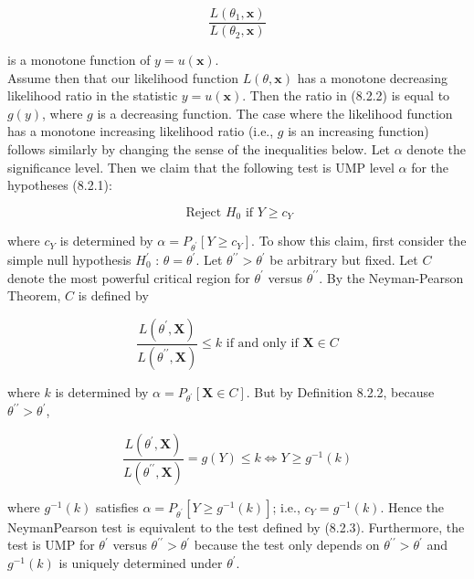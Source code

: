 \begin{equation*}
\frac{L\left(\theta_{1}, \mathbf{x}\right)}{L\left(\theta_{2}, \mathbf{x}\right)} \tag{8.2.2}
\end{equation*}


is a monotone function of $y=u(\mathbf{x})$.\\
Assume then that our likelihood function $L(\theta, \mathbf{x})$ has a monotone decreasing likelihood ratio in the statistic $y=u(\mathbf{x})$. Then the ratio in (8.2.2) is equal to $g(y)$, where $g$ is a decreasing function. The case where the likelihood function has a monotone increasing likelihood ratio (i.e., $g$ is an increasing function) follows similarly by changing the sense of the inequalities below. Let $\alpha$ denote the significance level. Then we claim that the following test is UMP level $\alpha$ for the hypotheses (8.2.1):


\begin{equation*}
\text { Reject } H_{0} \text { if } Y \geq c_{Y} \tag{8.2.3}
\end{equation*}


where $c_{Y}$ is determined by $\alpha=P_{\theta^{\prime}}\left[Y \geq c_{Y}\right]$. To show this claim, first consider the simple null hypothesis $H_{0}^{\prime}$ : $\theta=\theta^{\prime}$. Let $\theta^{\prime \prime}>\theta^{\prime}$ be arbitrary but fixed. Let $C$ denote the most powerful critical region for $\theta^{\prime}$ versus $\theta^{\prime \prime}$. By the Neyman-Pearson Theorem, $C$ is defined by

$$
\frac{L\left(\theta^{\prime}, \mathbf{X}\right)}{L\left(\theta^{\prime \prime}, \mathbf{X}\right)} \leq k \text { if and only if } \mathbf{X} \in C
$$

where $k$ is determined by $\alpha=P_{\theta^{\prime}}[\mathbf{X} \in C]$. But by Definition 8.2.2, because $\theta^{\prime \prime}>\theta^{\prime}$,

$$
\frac{L\left(\theta^{\prime}, \mathbf{X}\right)}{L\left(\theta^{\prime \prime}, \mathbf{X}\right)}=g(Y) \leq k \Leftrightarrow Y \geq g^{-1}(k)
$$

where $g^{-1}(k)$ satisfies $\alpha=P_{\theta^{\prime}}\left[Y \geq g^{-1}(k)\right]$; i.e., $c_{Y}=g^{-1}(k)$. Hence the NeymanPearson test is equivalent to the test defined by (8.2.3). Furthermore, the test is UMP for $\theta^{\prime}$ versus $\theta^{\prime \prime}>\theta^{\prime}$ because the test only depends on $\theta^{\prime \prime}>\theta^{\prime}$ and $g^{-1}(k)$ is uniquely determined under $\theta^{\prime}$.

